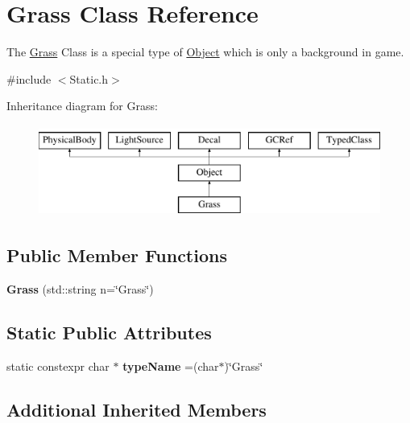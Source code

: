 \hypertarget{classGrass}{}\section{Grass Class Reference}
\label{classGrass}


The \hyperlink{classGrass}{Grass} Class is a special type of \hyperlink{classObject}{Object} which is only a background in game.  




{\ttfamily \#include $<$Static.\+h$>$}

Inheritance diagram for Grass\+:\begin{figure}[H]
\begin{center}
\leavevmode
\includegraphics[height=3.000000cm]{classGrass}
\end{center}
\end{figure}
\subsection*{Public Member Functions}
\begin{DoxyCompactItemize}
\item 
\hypertarget{classGrass_a09378b8347074a59fe6a5485a174841a}{}{\bfseries Grass} (std\+::string n=\char`\"{}Grass\char`\"{})\label{classGrass_a09378b8347074a59fe6a5485a174841a}

\end{DoxyCompactItemize}
\subsection*{Static Public Attributes}
\begin{DoxyCompactItemize}
\item 
\hypertarget{classGrass_a4c182f101c0eff9c9e1178bcf52f13af}{}static constexpr char $\ast$ {\bfseries type\+Name} =(char$\ast$)\char`\"{}Grass\char`\"{}\label{classGrass_a4c182f101c0eff9c9e1178bcf52f13af}

\end{DoxyCompactItemize}
\subsection*{Additional Inherited Members}


